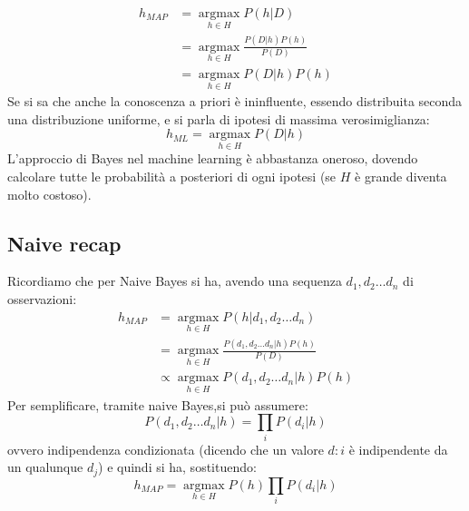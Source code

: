 \begin{equation*}
    \begin{split}
        h_{MAP}&=\operatorname*{argmax}_{h\in H}P(h|D) \\
        & = \operatorname*{argmax}_{h\in H}\frac{P(D|h)P(h)}{P(D)} \\
        & = \operatorname*{argmax}_{h\in H}P(D|h)P(h)
    \end{split}
\end{equation*}
Se si sa che anche la conoscenza a priori è ininfluente, essendo distribuita seconda una distribuzione uniforme, e si parla di ipotesi di massima verosimiglianza:
\[h_{ML}=\operatorname*{argmax}_{h\in H}P(D|h)\]
L'approccio di Bayes nel machine learning è abbastanza oneroso, dovendo
calcolare tutte le probabilità a posteriori di ogni ipotesi (se $H$ è grande diventa molto costoso).

\subsection{Naive recap}
Ricordiamo che per Naive Bayes si ha, avendo una sequenza $d_1,d_2\ldots d_n$ di osservazioni: 
\begin{equation*}
    \begin{split}
        h_{MAP}&=\operatorname*{argmax}_{h\in H}P(h|d_1,d_2\ldots d_n) \\
        &=\operatorname*{argmax}_{h\in H}\frac{P(d_1,d_2\ldots d_n|h)P(h)}{P(D)} \\
        &\varpropto\operatorname*{argmax}_{h\in H}P(d_1,d_2\ldots d_n|h)P(h)
    \end{split}
\end{equation*}
Per semplificare, tramite naive Bayes,si può assumere:
\[P(d_1,d_2\ldots d_n|h)=\prod_iP(d_i|h)\]
ovvero indipendenza condizionata (dicendo che un valore $d:i$ è indipendente da
un qualunque $d_j$) e quindi si ha, sostituendo:
\[h_{MAP}=\operatorname*{argmax}_{h\in H}P(h)\prod_iP(d_i|h)\]
